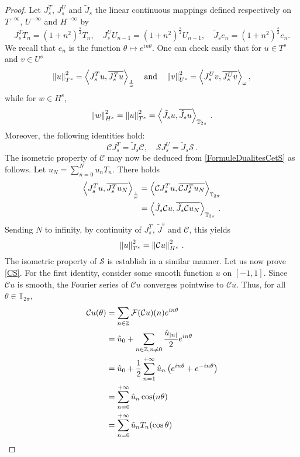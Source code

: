\documentclass[a4paper]{article}
\begin{document}
\begin{proof}
	Let $J_s^T$, $J_s^U$ and $\tilde{J}_s$ the linear continuous mappings defined respectively on $T^{-\infty}$, $U^{-\infty}$ and $H^{-\infty}$ by
	\[J_s^TT_n = (1 + n^2)^\frac{s}{2} T_n, \quad J_s^UU_{n-1} = (1 + n^2)^{\frac{s}{2}} U_{n-1}, \quad \tilde{J}_s e_n = (1 + n^2)^\frac{s}{2} e_n.\]
	We recall that $e_n$ is the function $\theta \mapsto e^{in\theta}$. One can check easily that for $u \in T^s$ and $v \in U^s$
	\[\left\|u\right\|_{T^s}^2 = \left\langle J_s^Tu,\overline{J_s^T u}\right\rangle_\frac{1}{\omega}\quad \text{and}\quad \left\|v\right\|_{U^s}^2 = \left\langle J_s^U v,\overline{J_s^U v}\right\rangle_\omega,\]
	while for $w \in H^s$, 
	\[\left\|w\right\|_{H^s}^2 = \left\|u\right\|_{T^s}^2 = \left\langle \tilde{J}_su,\overline{\tilde{J}_s u}\right\rangle_{\mathbb{T}_{2\pi}}\,.\]
	Moreover, the following identities hold:
	\[\mathcal{C} J_s^T = \tilde{J}_s \mathcal{C}, \quad \mathcal{S} J_s^U = \tilde{J}_s \mathcal{S}\,.\]
	The isometric property of $\mathcal{C}$ may now be deduced from \autoref{FormuleDualitesCetS} as follows. Let $u_N = \sum_{n = 0}^N u_n T_n$. There holds 
	\[\begin{split}
	\left\langle J_s^T u,\overline{J_s^T u_N}\right\rangle_{\frac{1}{\omega}} &= \left\langle \mathcal{C} J_s^T u,\overline{\mathcal{C} J_s^T u_N}\right\rangle_{\mathbb{T}_{2\pi}}\\
	& = \left\langle \tilde{J}_s \mathcal{C} u,\overline{\tilde{J}_s \mathcal{C} u_N}\right\rangle_{\mathbb{T}_{2\pi}}\,.
	\end{split}\] 
	Sending $N$ to infinity, by continuity of $J_s^T$, $\tilde{J}^s$ and $\mathcal{C}$, this yields
	\[\left\|u\right\|_{T^s}^2 = \left\|\mathcal{C}u\right\|_{H^s}^2\,.\]
	The isometric property of $\mathcal{S}$ is establish in a similar manner. Let us now prove \eqref{CS}. For the first identity, consider some smooth function $u$ on $[-1,1]$. Since $\mathcal{C}u$ is smooth, the Fourier series of $\mathcal{C}u$ converges pointwise to $\mathcal{C}u$. Thus, for all $\theta \in \mathbb{T}_{2\pi}$,
	\[\begin{split}
	\mathcal{C}u(\theta) &= \sum_{n \in \mathbb{Z}} \mathcal{F}(\mathcal{C}u)(n)e^{in\theta}\\
	&= \hat{u}_0 + \sum_{n \in \mathbb{Z}, n\neq 0} \frac{\hat{u}_{\left\lvert n \right\rvert}}{2} e^{in\theta}\\
	&= \hat{u}_0 + \frac{1}{2}\sum_{n = 1}^{+\infty} \hat{u}_n \left(e^{in\theta} + e^{-in\theta} \right)\\
	& = \sum_{n = 0}^{+ \infty} \hat{u}_n \cos(n \theta)\\
	& = \sum_{n = 0}^{+ \infty} \hat{u}_n T_n(\cos\theta)
	\end{split}\]

\end{proof}
\end{document}
